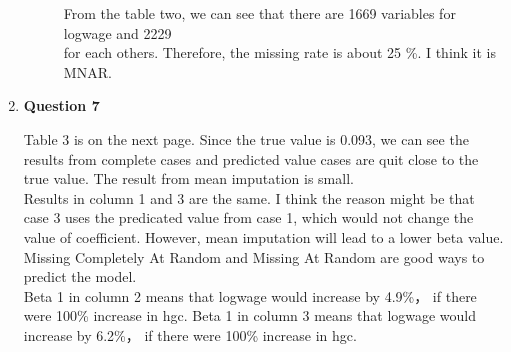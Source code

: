 \documentclass[11pt,a4paper]{article}
\begin{document}
\begin{enumerate}
\begin{description}
From the table two, we can see that there are 1669 variables for logwage and 2229 \\for each others. Therefore, the missing rate is about 25 \%. I think it is MNAR.
          \end{description}
          
    \item \textbf{Question 7}
		  \begin{description}
		  Table 3 is on the next page. Since the true value is 0.093, we can see the results from complete cases and predicted value cases are quit close to the true value. The result from mean imputation is small. \\
		  Results in column 1 and 3 are the same. I think the reason might be that case 3 uses the predicated value from case 1, which would not change the value of coefficient. However, mean imputation will lead to a lower beta value.  Missing Completely At Random and Missing At Random are good ways to predict the model.\\
		  Beta 1 in column 2 means that logwage would increase by 4.9\%， if there were 100\% increase in hgc. Beta 1 in column 3 means that logwage would increase by 6.2\%， if there were 100\% increase in hgc.


\end{description}
\end{enumerate}
\end{document}
